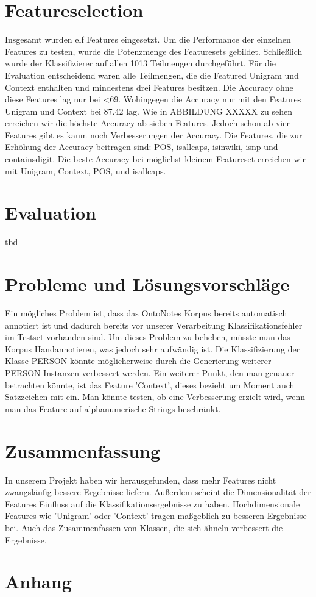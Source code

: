 \documentclass[a4paper, 11pt]{article}
\begin{document}
\section{Featureselection}
Insgesamt wurden elf Features eingesetzt. Um die Performance der einzelnen Features zu testen, wurde die Potenzmenge des Featuresets gebildet. Schließlich wurde der Klassifizierer auf allen 1013 Teilmengen durchgeführt. Für die Evaluation entscheidend waren alle Teilmengen, die die Featured Unigram und Context enthalten und mindestens drei Features besitzen. Die Accuracy ohne diese Features lag nur bei <69. Wohingegen die Accuracy nur mit den Features Unigram und Context bei 87.42 lag. Wie in ABBILDUNG XXXXX zu sehen erreichen wir die höchste Accuracy ab sieben Features. Jedoch schon ab vier Features gibt es kaum noch Verbesserungen der Accuracy. Die Features, die zur Erhöhung der Accuracy beitragen sind: POS, isallcaps, isinwiki, isnp und containsdigit. Die beste Accuracy bei möglichst kleinem Featureset erreichen wir mit Unigram, Context, POS, und isallcaps.
\section{Evaluation}
tbd
\section{Probleme und Lösungsvorschläge}
Ein mögliches Problem ist, dass das OntoNotes Korpus bereits automatisch annotiert ist und dadurch bereits vor unserer Verarbeitung Klassifikationsfehler im Testset vorhanden sind. Um dieses Problem zu beheben, müsste man das Korpus Handannotieren, was jedoch sehr aufwändig ist. Die Klassifizierung der Klasse PERSON könnte möglicherweise durch die Generierung weiterer PERSON-Instanzen verbessert werden. Ein weiterer Punkt, den man genauer betrachten könnte, ist das Feature 'Context', dieses bezieht um Moment auch Satzzeichen mit ein. Man könnte testen, ob eine Verbesserung erzielt wird, wenn man das Feature auf alphanumerische Strings beschränkt.
\section{Zusammenfassung}
In unserem Projekt haben wir herausgefunden, dass mehr Features nicht zwangsläufig bessere Ergebnisse liefern. Außerdem scheint die Dimensionalität der Features Einfluss auf die Klassifikationsergebnisse zu haben. Hochdimensionale Features wie 'Unigram' oder 'Context' tragen maßgeblich zu besseren Ergebnisse bei. Auch das Zusammenfassen von Klassen, die sich ähneln verbessert die Ergebnisse.
\section{Anhang}
\end{document}
